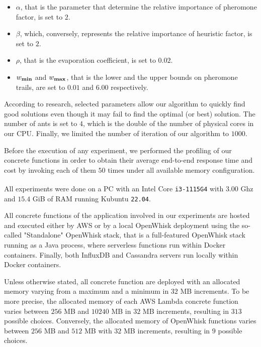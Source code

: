\documentclass[12pt,a4paper]{report}
\begin{document}
\begin{itemize}
	\item $\alpha$, that is the parameter that determine the relative importance of pheromone factor, is set to $2$.
	\item $\beta$, which, conversely, represents the relative importance of heuristic factor, is set to $2$.
	\item $\rho$, that is the evaporation coefficient, is set to $0.02$.
	\item $w_{\text{\textbf{min}}}$ and $w_{\text{\textbf{max}}}$, that is the lower and the upper bounds on pheromone trails, are set to $0.01$ and $6.00$ respectively.
\end{itemize}

According to \citet{acosemplice} research, selected parameters allow our algorithm to quickly find good solutions even though it may fail to find the optimal (or best) solution. The number of ants is set to $4$, which is the double of the number of physical cores in our CPU. Finally, we limited the number of iteration of our algorithm to $1000$.

Before the execution of any experiment, we performed the profiling of our concrete functions in order to obtain their average end-to-end response time and cost by invoking each of them $50$ times under all available memory configuration.

All experiments were done on a PC with an Intel\textsuperscript{\textregistered} Core\textsuperscript{\texttrademark} \texttt{i3-1115G4} with $3.00$ Ghz and $15.4$ GiB of RAM running Kubuntu \texttt{22.04}.

All concrete functions of the application involved in our experiments are hosted and executed either by AWS or by a local OpenWhisk deployment using the so-called "Standalone" OpenWhisk stack, that is a full-featured OpenWhisk stack running as a Java process, where serverless functions run within Docker containers. Finally, both InfluxDB and Cassandra servers run locally within Docker containers.

Unless otherwise stated, all concrete function are deployed with an allocated memory varying from a maximum and a minimum in $32$ MB increments. To be more precise, the allocated memory of each AWS Lambda concrete function varies between $256$ MB and $10240$ MB in $32$ MB increments, resulting in $313$ possible choices. Conversely, the allocated memory of OpenWhisk functions varies between $256$ MB and $512$ MB with $32$ MB increments, resulting in $9$ possible choices. 
\end{document}
